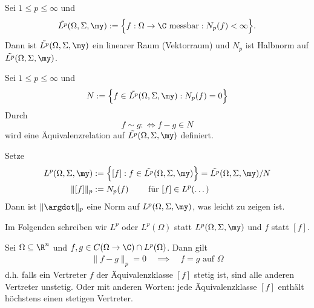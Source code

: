 \begin{df} \label{2.9}
	Sei $1 \le p \le \infty$ und
	\[
		\tilde {L^p} (\Omega, \Sigma, \my)
		:= \Big\{ f : \Omega \to \C \text{ messbar} : N_p(f) < \infty \Big\}.
	\]
	Dann ist $\tilde{L^p}(\Omega, \Sigma, \my)$ ein linearer Raum (Vektorraum) und $N_p$ ist Halbnorm auf $\tilde{L^p}(\Omega, \Sigma, \my)$.
\end{df}

\begin{df} \label{2.10}
	Sei $1 \le p \le \infty$ und
	\begin{align*}
		N := \Big\{ f \in \tilde {L^p}(\Omega, \Sigma, \my) : N_p(f) = 0 \Big\}
	\end{align*}
	Durch
	\[
		f \sim g :\iff f-g \in N
	\]
	wird eine Äquivalenzrelation auf $\tilde{L^p}(\Omega, \Sigma, \my)$ definiert.

	Setze
	\begin{align*}
		L^p(\Omega, \Sigma, \my)
		&:= \Big\{ [f] : f \in \tilde{L^p}(\Omega, \Sigma, \my) \Big\}
		= \tilde {L^p} (\Omega, \Sigma, \my) / N \\
		\| [f] \|_p &:= N_p(f) \qquad \text{ für } [f] \in L^p(\dots)
	\end{align*}
	Dann ist $\|\argdot\|_p$ eine Norm auf $L^p(\Omega, \Sigma, \my)$, was leicht zu zeigen ist.

	Im Folgenden schreiben wir $L^p$ oder $L^p(\Omega)$ statt $L^p(\Omega, \Sigma, \my)$ und $f$ statt $[f]$.
\end{df}

\begin{nt} \label{2.11}
	Sei $\Omega \subset \R^n$ und $f,g \in C(\Omega \to \C) \cap L^p(\Omega)$.
	Dann gilt
	\begin{align*}
		\|f - g \|_p = 0
		\quad\implies\quad
		f = g \text{ auf $\Omega$}
	\end{align*}
	d.h. falls ein Vertreter $f$ der Äquivalenzklasse $[f]$ stetig ist, sind alle anderen Vertreter unstetig.
	Oder mit anderen Worten: jede Äquivalenzklasse $[f]$ enthält höchstens einen stetigen Vertreter.
\end{nt}

